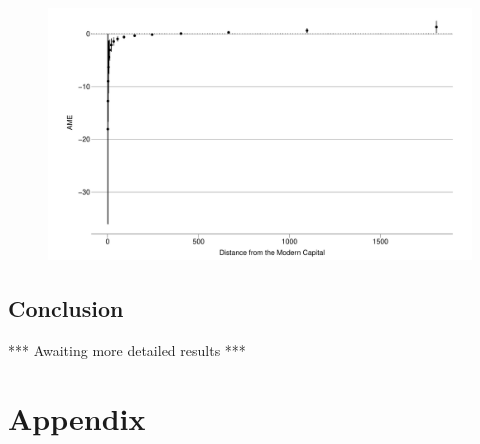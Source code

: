 \documentclass[12pt]{article}
\begin{document}
\begin{figure}[htpb]
	\centering
	\includegraphics[width=\linewidth]{"../R/Output/state_based_int_plot.pdf"}
	\caption{}
	\label{sb_int}
\end{figure}

\begin{multicols}{2}

\section{Conclusion}

*** Awaiting more detailed results ***

\end{multicols}

\pagebreak




\pagebreak
\section*{Appendix}





\end{document}

